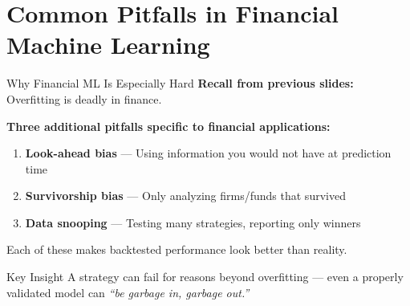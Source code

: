 \documentclass[10pt]{beamer}
\newcommand{\highlight}[1]{\textcolor{AccentOrange}{\textbf{#1}}}
\begin{document}

\section{Common Pitfalls in Financial Machine Learning}

\begin{frame}{Why Financial ML Is Especially Hard}
  \textbf{Recall from previous slides:} Overfitting is deadly in finance.
  
  \vspace{1em}
  \textbf{Three additional pitfalls specific to financial applications:}
  
  \vspace{0.5em}
  \begin{enumerate}
    \item \highlight{Look-ahead bias} — Using information you would not have at prediction time
    \vspace{0.3em}
    \item \highlight{Survivorship bias} — Only analyzing firms/funds that survived
    \vspace{0.3em}
    \item \highlight{Data snooping} — Testing many strategies, reporting only winners
  \end{enumerate}
  
  \vspace{1em}
  Each of these makes backtested performance look better than reality.
  
  \vspace{0.5em}
  \begin{block}{Key Insight}
    A strategy can fail for reasons beyond overfitting — even a properly validated model can \emph{``be garbage in, garbage out.''}
  \end{block}
\end{frame}
\end{document}
